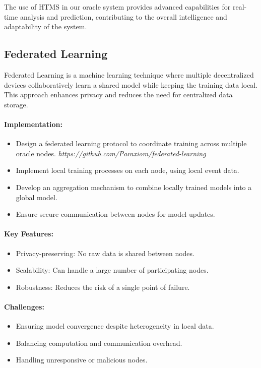 \documentclass[12pt,a4paper]{article}
\begin{document}
	The use of HTMS in our oracle system provides advanced capabilities for real-time analysis and prediction, contributing to the overall intelligence and adaptability of the system.
	
\subsection{Federated Learning}
Federated Learning is a machine learning technique where multiple decentralized devices collaboratively learn a shared model while keeping the training data local. This approach enhances privacy and reduces the need for centralized data storage.

\paragraph{Implementation:}
\begin{itemize}
	\item Design a federated learning protocol to coordinate training across multiple oracle nodes.
\textit{{\tiny 	https://github.com/Paraxiom/federated-learning}}
	\item Implement local training processes on each node, using local event data.
	\item Develop an aggregation mechanism to combine locally trained models into a global model.
	\item Ensure secure communication between nodes for model updates.
\end{itemize}

\paragraph{Key Features:}
\begin{itemize}
	\item Privacy-preserving: No raw data is shared between nodes.
	\item Scalability: Can handle a large number of participating nodes.
	\item Robustness: Reduces the risk of a single point of failure.
\end{itemize}

\paragraph{Challenges:}
\begin{itemize}
	\item Ensuring model convergence despite heterogeneity in local data.
	\item Balancing computation and communication overhead.
	\item Handling unresponsive or malicious nodes.
\end{itemize}
\end{document}

